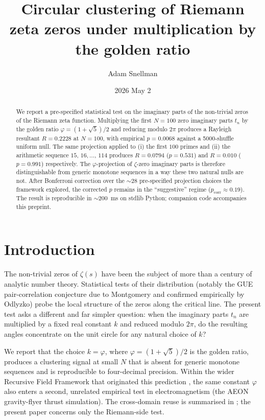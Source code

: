 \documentclass[11pt,a4paper]{article}
\title{Circular clustering of Riemann zeta zeros under multiplication by the golden ratio}
\author{Adam Snellman}
\affil{Independent researcher, Brisbane, Australia\\\texttt{github.com/wizardaax} \quad \texttt{wizardaax.github.io}}
\date{2026 May 2}
\begin{document}
\maketitle

\begin{abstract}
We report a pre-specified statistical test on the imaginary parts of the
non-trivial zeros of the Riemann zeta function. Multiplying the first
$N=100$ zero imaginary parts $t_n$ by the golden ratio $\varphi = (1+\sqrt{5})/2$
and reducing modulo $2\pi$ produces a Rayleigh resultant
$R = 0.2228$ at $N=100$, with empirical $p = 0.0068$ against
a 5000-shuffle uniform null. The same projection applied to (i) the first
$100$ primes and (ii) the arithmetic sequence $15,\,16,\dots,\,114$ produces
$R = 0.0794$ ($p=0.531$) and $R = 0.010$ ($p=0.991$) respectively. The
$\varphi$-projection of $\zeta$-zero imaginary parts is therefore distinguishable from
generic monotone sequences in a way these two natural nulls are not.
After Bonferroni correction over the $\sim 28$ pre-specified projection
choices the framework explored, the corrected $p$ remains in the
``suggestive'' regime ($p_{\text{corr}} \approx 0.19$). The result is reproducible
in $\sim 200$~ms on stdlib Python; companion code accompanies this preprint.
\end{abstract}

\section{Introduction}

The non-trivial zeros of $\zeta(s)$ have been the subject of more than a century
of analytic number theory. Statistical tests of their distribution
(notably the GUE pair-correlation conjecture due to Montgomery and confirmed
empirically by Odlyzko) probe the local structure of the zeros along the
critical line. The present test asks a different and far simpler question:
when the imaginary parts $t_n$ are multiplied by a fixed real constant $k$ and
reduced modulo $2\pi$, do the resulting angles concentrate on the unit
circle for any natural choice of $k$?

We report that the choice $k = \varphi$, where $\varphi = (1+\sqrt{5})/2$ is
the golden ratio, produces a clustering signal at small $N$ that is absent
for generic monotone sequences and is reproducible to four-decimal precision.
Within the wider Recursive Field Framework that originated this prediction
\cite{rff-substrate}, the same constant $\varphi$ also enters a second,
unrelated empirical test in electromagnetism (the AEON gravity-flyer thrust
simulation). The cross-domain reuse is summarised in
\cite{cross-domain-meta}; the present paper concerns only the
Riemann-side test.
\end{document}
